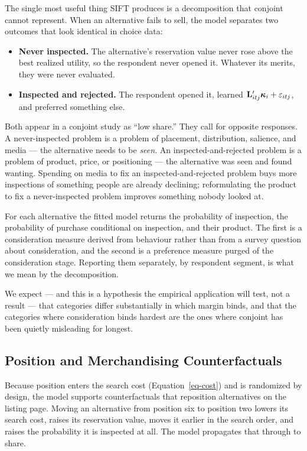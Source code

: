 \documentclass[
  letterpaper,
  DIV=11,
  numbers=noendperiod]{scrartcl}
\providecommand{\tightlist}{%
  \setlength{\itemsep}{0pt}\setlength{\parskip}{0pt}}
\begin{document}
The single most useful thing SIFT produces is a decomposition that
conjoint cannot represent. When an alternative fails to sell, the model
separates two outcomes that look identical in choice data:

\begin{itemize}
\tightlist
\item
  \textbf{Never inspected.} The alternative's reservation value never
  rose above the best realized utility, so the respondent never opened
  it. Whatever its merits, they were never evaluated.
\item
  \textbf{Inspected and rejected.} The respondent opened it, learned
  \(\mathbf{L}_{itj}'\boldsymbol{\kappa}_i + \varepsilon_{itj}\), and preferred something
  else.
\end{itemize}

Both appear in a conjoint study as ``low share.'' They call for opposite
responses. A never-inspected problem is a problem of placement,
distribution, salience, and media --- the alternative needs to be
\emph{seen}. An inspected-and-rejected problem is a problem of product,
price, or positioning --- the alternative was seen and found wanting.
Spending on media to fix an inspected-and-rejected problem buys more
inspections of something people are already declining; reformulating the
product to fix a never-inspected problem improves something nobody
looked at.

For each alternative the fitted model returns the probability of
inspection, the probability of purchase conditional on inspection, and
their product. The first is a consideration measure derived from
behaviour rather than from a survey question about consideration, and
the second is a preference measure purged of the consideration stage.
Reporting them separately, by respondent segment, is what we mean by the
decomposition.

We expect --- and this is a hypothesis the empirical application will
test, not a result --- that categories differ substantially in which
margin binds, and that the categories where consideration binds hardest
are the ones where conjoint has been quietly misleading for longest.

\subsection{Position and Merchandising
Counterfactuals}\label{sec-managerial-position}

Because position enters the search cost (Equation~\ref{eq-cost}) and is
randomized by design, the model supports counterfactuals that reposition
alternatives on the listing page. Moving an alternative from position
six to position two lowers its search cost, raises its reservation
value, moves it earlier in the search order, and raises the probability
it is inspected at all. The model propagates that through to share.
\end{document}
